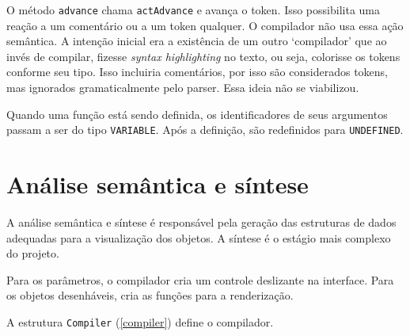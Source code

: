O método \texttt{advance} chama \texttt{actAdvance} e avança o token.
Isso possibilita uma reação a um comentário ou a um token qualquer.
O compilador não usa essa ação semântica.
A intenção inicial era a existência de um outro `compilador'
que ao invés de compilar, fizesse \textit{syntax highlighting}
no texto, ou seja, colorisse os tokens conforme seu tipo.
Isso incluiria comentários, por isso são considerados tokens,
mas ignorados gramaticalmente pelo parser.
Essa ideia não se viabilizou.

Quando uma função está sendo definida, os identificadores de seus argumentos
passam a ser do tipo \texttt{VARIABLE}.
Após a definição, são redefinidos para \texttt{UNDEFINED}.

\section{Análise semântica e síntese}
A análise semântica e síntese é responsável pela geração das estruturas de dados
adequadas para a visualização dos objetos.
A síntese é o estágio mais complexo do projeto.

Para os parâmetros, o compilador cria um controle deslizante na interface.
Para os objetos desenháveis, cria as funções para a renderização.

\newpage
A estrutura \texttt{Compiler} (\ref{compiler}) define o compilador.

